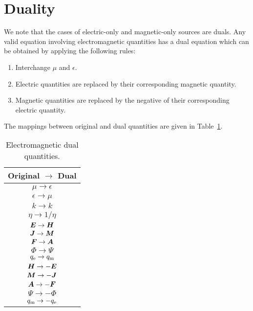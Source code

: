 \section{Duality}
We note that the cases of electric-only and magnetic-only sources are duals.
Any valid equation involving electromagnetic quantities has a dual equation
which can be obtained by applying the following rules:
\begin{enumerate}
\item Interchange $\mu$ and $\epsilon$.
\item Electric quantities are replaced by their corresponding magnetic quantity.
\item Magnetic quantities are replaced by the negative of their corresponding electric quantity.
\end{enumerate}
The mappings between original and dual quantities are given in 
Table~\ref{tab:duals}.
\begin{table}[htbp]
  \begin{center}
    \leavevmode
    \begin{tabular}{|c|} \hline
      \bfseries Original $\boldsymbol{\rightarrow}$ Dual \\ \hline \hline
      $\mu \rightarrow \epsilon$ \\ \hline
      $\epsilon \rightarrow \mu$ \\ \hline
      $k \rightarrow k$ \\ \hline
      $\eta \rightarrow 1/\eta$ \\ \hline
      $\boldsymbol{E} \rightarrow \boldsymbol{H}$ \\ \hline
      $\boldsymbol{J} \rightarrow \boldsymbol{M}$ \\ \hline
      $\boldsymbol{F} \rightarrow \boldsymbol{A}$ \\ \hline
      $\Phi \rightarrow \Psi$ \\ \hline
      $q_{\text{e}} \rightarrow q_{\text{m}}$ \\ \hline
      $\boldsymbol{H} \rightarrow -\boldsymbol{E}$ \\ \hline
      $\boldsymbol{M} \rightarrow -\boldsymbol{J}$ \\ \hline
      $\boldsymbol{A} \rightarrow -\boldsymbol{F}$ \\ \hline
      $\Psi \rightarrow -\Phi$ \\ \hline
      $q_{\text{m}} \rightarrow -q_{\text{e}}$ \\ \hline
    \end{tabular}
    \caption{Electromagnetic dual quantities.}
    \label{tab:duals}
  \end{center}
\end{table}

